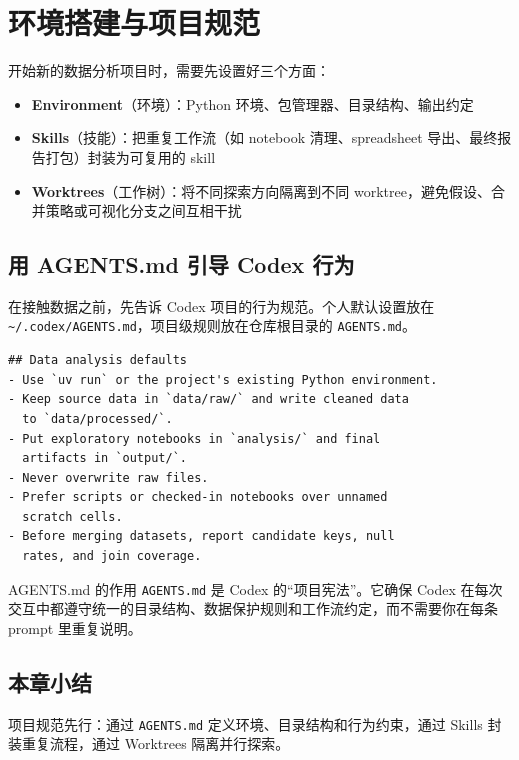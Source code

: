 \documentclass[a4paper]{article}
\begin{document}
\section{环境搭建与项目规范}

开始新的数据分析项目时，需要先设置好三个方面：

\begin{itemize}[nosep]
    \item \textbf{Environment}（环境）：Python 环境、包管理器、目录结构、输出约定
    \item \textbf{Skills}（技能）：把重复工作流（如 notebook 清理、spreadsheet 导出、最终报告打包）封装为可复用的 skill
    \item \textbf{Worktrees}（工作树）：将不同探索方向隔离到不同 worktree，避免假设、合并策略或可视化分支之间互相干扰
\end{itemize}

\subsection{用 AGENTS.md 引导 Codex 行为}

在接触数据之前，先告诉 Codex 项目的行为规范。个人默认设置放在 \texttt{\textasciitilde/.codex/AGENTS.md}，项目级规则放在仓库根目录的 \texttt{AGENTS.md}。

\begin{lstlisting}[caption={一个简洁的 AGENTS.md 示例},language={}]
## Data analysis defaults
- Use `uv run` or the project's existing Python environment.
- Keep source data in `data/raw/` and write cleaned data
  to `data/processed/`.
- Put exploratory notebooks in `analysis/` and final
  artifacts in `output/`.
- Never overwrite raw files.
- Prefer scripts or checked-in notebooks over unnamed
  scratch cells.
- Before merging datasets, report candidate keys, null
  rates, and join coverage.
\end{lstlisting}

\begin{importantbox}{AGENTS.md 的作用}
\texttt{AGENTS.md} 是 Codex 的``项目宪法''。它确保 Codex 在每次交互中都遵守统一的目录结构、数据保护规则和工作流约定，而不需要你在每条 prompt 里重复说明。
\end{importantbox}

\subsection{本章小结}
项目规范先行：通过 \texttt{AGENTS.md} 定义环境、目录结构和行为约束，通过 Skills 封装重复流程，通过 Worktrees 隔离并行探索。
\end{document}

